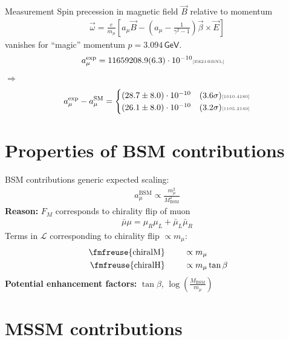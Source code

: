 \documentclass[hyperref={pdfpagelabels=false},ngerman]{beamer}
\newcommand{\fmfvcenter}[1]{\;\vcenter{\hbox{\fmfreuse{#1}}}\;}
\newcommand{\eh}[1]{\,\mathsf{#1}}
\newcommand{\mycite}[1]{\textcolor{darkgray}{\tiny [#1]}}
\renewcommand{\emph}{\textbf}
\newcommand{\SM}{\ensuremath{\text{SM}}}
\newcommand{\amu}{a_\mu}
\newcommand{\amuexp}{\amu^{\text{exp}}}
\newcommand{\amuSM}{\amu^{\SM}}
\begin{document}
\begin{frame}{Measurement}
  Spin precession in magnetic field $\vec{B}$ relative to momentum
  \begin{align*}
    \vec{\omega} = \frac{e}{m_\mu} \left[\amu\vec{B}
      - \left(\amu - \frac{1}{\gamma^2 - 1}\right)
      \vec{\beta}\times\vec{E} \right]
  \end{align*}
  vanishes for ``magic'' momentum $p=3.094\eh{GeV}$.
  \begin{align*}
    \amuexp &= 11659208.9(6.3)\cdot 10^{-10} \text{\mycite{E821@BNL}}
  \end{align*}
  $\Rightarrow$
  \begin{align*}
    \amuexp - \amuSM =
    \begin{cases}
      (28.7 \pm 8.0)\cdot 10^{-10} &(3.6\sigma) \text{\mycite{1010.4180}} \\
      (26.1 \pm 8.0)\cdot 10^{-10} &(3.2\sigma) \text{\mycite{1105.3149}}
    \end{cases}
  \end{align*}
\end{frame}

\section{Properties of BSM contributions}

\begin{frame}{BSM contributions}
  generic expected scaling:
  \begin{align*}
    a_\mu^\text{BSM} \propto \frac{m_\mu^2}{M_\text{BSM}^2}
  \end{align*}
  \emph{Reason:} $F_M$ corresponds to chirality flip of muon
  \begin{align*}
    \bar{\mu}\mu = \mu_R \mu_L + \bar{\mu}_L \bar{\mu}_R
  \end{align*}
  Terms in $\mathcal{L}$ corresponding to chirality flip $\propto m_\mu$:
  \begin{align*}
    \fmfvcenter{chiralM} &\qquad\propto m_\mu \\
    \fmfvcenter{chiralH} &\qquad\propto m_\mu \tan\beta
  \end{align*}
  \emph{Potential enhancement factors:}
  $\tan\beta$, $\log\left(\frac{M_\text{BSM}}{m_\mu}\right)$
\end{frame}

\section{MSSM contributions}
\end{document}
